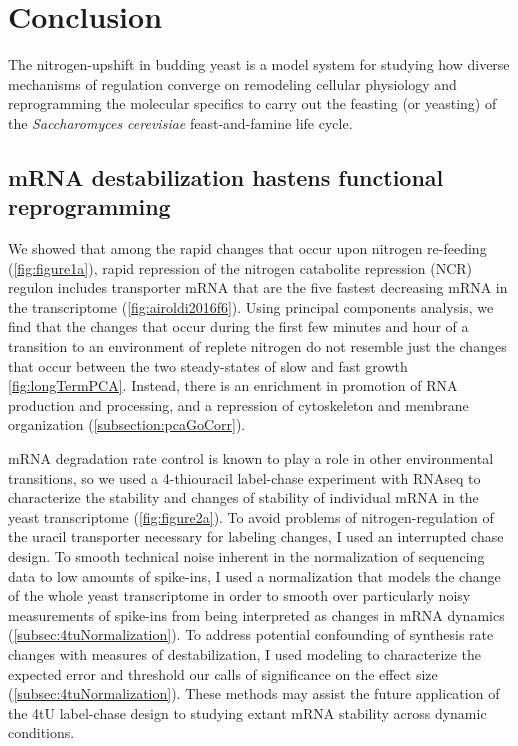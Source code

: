\chapter{Conclusion}

The nitrogen-upshift in budding yeast is a model system for studying
how diverse mechanisms of regulation converge on remodeling cellular
physiology and reprogramming the molecular specifics to 
carry out the feasting (or yeasting) of the \textit{Saccharomyces
cerevisiae} feast-and-famine life cycle.

\section{mRNA destabilization hastens functional reprogramming}

We showed that among the rapid changes that occur upon
nitrogen re-feeding (\autoref{fig:figure1a}), 
rapid repression of the nitrogen catabolite repression (NCR) 
regulon includes transporter mRNA that are the five
fastest decreasing mRNA in the transcriptome 
(\autoref{fig:airoldi2016f6}).
Using principal components analysis, we find that the changes
that occur during the first few minutes and hour of a transition
to an environment of replete nitrogen do not resemble just the changes
that occur between the two steady-states of slow and fast growth
\autoref{fig:longTermPCA}.
Instead, there is an enrichment in promotion of RNA production and
processing, and a repression of cytoskeleton and membrane
organization (\autoref{subsection:pcaGoCorr}).

mRNA degradation rate control is known to play a role in other
environmental transitions, so we used a 4-thiouracil label-chase
experiment with RNAseq to characterize the stability and changes
of stability of individual mRNA in the yeast transcriptome 
(\autoref{fig:figure2a}).
To avoid problems of nitrogen-regulation of the uracil transporter
necessary for labeling changes, I used an interrupted chase
design.
To smooth technical noise inherent in the normalization of sequencing
data to low amounts of spike-ins, I used a normalization that models
the change of the whole yeast transcriptome in order to smooth over
particularly noisy measurements of spike-ins from being interpreted
as changes in mRNA dynamics (\autoref{subsec:4tuNormalization}).
To address potential confounding of synthesis rate changes with
measures of destabilization, I used modeling to characterize the
expected error and threshold our calls of significance on the
effect size (\autoref{subsec:4tuNormalization}).
These methods may assist the future application of the 4tU label-chase
design to studying extant mRNA stability across dynamic conditions.

